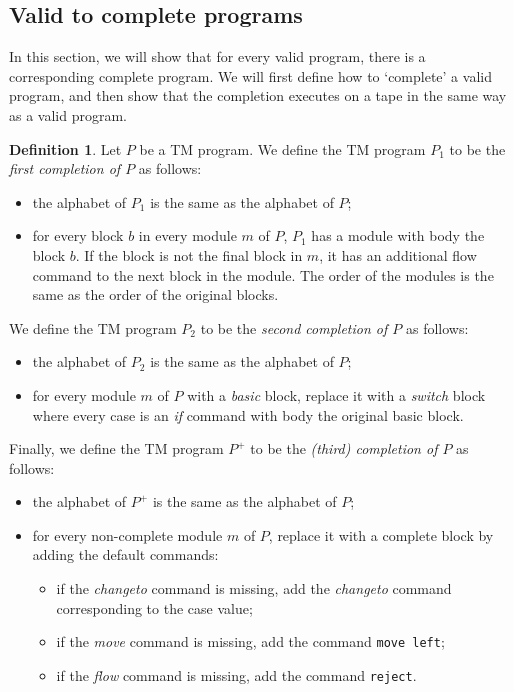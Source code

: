 \documentclass{article}
\theoremstyle{definition}
\newtheorem{definition}[rules]{Definition}
\theoremstyle{plain}
\begin{document}
\subsection{Valid to complete programs}
In this section, we will show that for every valid program, there is a corresponding complete program. We will first define how to `complete' a valid program, and then show that the completion executes on a tape in the same way as a valid program.
\begin{definition}
    Let $P$ be a TM program. We define the TM program $P_1$ to be the \emph{first completion of $P$} as follows:
    \begin{itemize}
        \item the alphabet of $P_1$ is the same as the alphabet of $P$;
        \item for every block $b$ in every module $m$ of $P$, $P_1$ has a module with body the block $b$. If the block is not the final block in $m$, it has an additional flow command to the next block in the module. The order of the modules is the same as the order of the original blocks.
    \end{itemize}
    We define the TM program $P_2$ to be the \emph{second completion of $P$} as follows:
    \begin{itemize}
        \item the alphabet of $P_2$ is the same as the alphabet of $P$;
        \item for every module $m$ of $P$ with a \textit{basic} block, replace it with a \textit{switch} block where every case is an \textit{if} command with body the original basic block.
    \end{itemize}
    Finally, we define the TM program $P^+$ to be the \emph{(third) completion of $P$} as follows:
    \begin{itemize}
        \item the alphabet of $P^+$ is the same as the alphabet of $P$;
        \item for every non-complete module $m$ of $P$, replace it with a complete block by adding the default commands:
        \begin{itemize}
            \item if the \textit{changeto} command is missing, add the \textit{changeto} command corresponding to the case value;
            \item if the \textit{move} command is missing, add the command \texttt{move left};
            \item if the \textit{flow} command is missing, add the command \texttt{reject}.
        \end{itemize}
    \end{itemize}
\end{definition}
\end{document}
